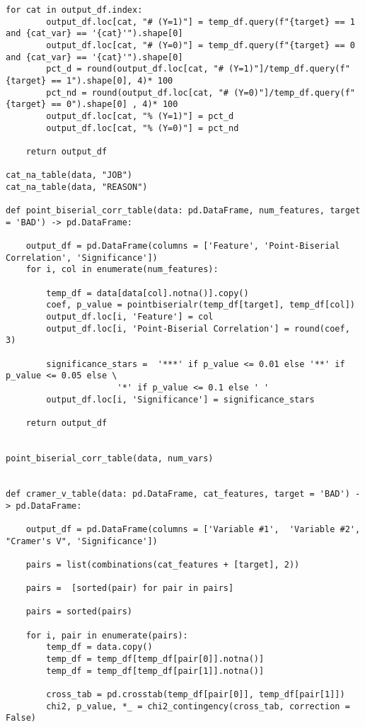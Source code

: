 \begin{lstlisting}[basicstyle=\footnotesize\ttfamily]
    for cat in output_df.index:
        output_df.loc[cat, "# (Y=1)"] = temp_df.query(f"{target} == 1 and {cat_var} == '{cat}'").shape[0]
        output_df.loc[cat, "# (Y=0)"] = temp_df.query(f"{target} == 0 and {cat_var} == '{cat}'").shape[0]
        pct_d = round(output_df.loc[cat, "# (Y=1)"]/temp_df.query(f"{target} == 1").shape[0], 4)* 100
        pct_nd = round(output_df.loc[cat, "# (Y=0)"]/temp_df.query(f"{target} == 0").shape[0] , 4)* 100
        output_df.loc[cat, "% (Y=1)"] = pct_d
        output_df.loc[cat, "% (Y=0)"] = pct_nd

    return output_df

cat_na_table(data, "JOB")
cat_na_table(data, "REASON")

def point_biserial_corr_table(data: pd.DataFrame, num_features, target = 'BAD') -> pd.DataFrame:
    
    output_df = pd.DataFrame(columns = ['Feature', 'Point-Biserial Correlation', 'Significance'])
    for i, col in enumerate(num_features):
        
        temp_df = data[data[col].notna()].copy()
        coef, p_value = pointbiserialr(temp_df[target], temp_df[col])
        output_df.loc[i, 'Feature'] = col
        output_df.loc[i, 'Point-Biserial Correlation'] = round(coef, 3)

        significance_stars =  '***' if p_value <= 0.01 else '**' if p_value <= 0.05 else \
		              '*' if p_value <= 0.1 else ' '
        output_df.loc[i, 'Significance'] = significance_stars

    return output_df
    

point_biserial_corr_table(data, num_vars)


def cramer_v_table(data: pd.DataFrame, cat_features, target = 'BAD') -> pd.DataFrame:
    
    output_df = pd.DataFrame(columns = ['Variable #1',  'Variable #2', "Cramer's V", 'Significance'])

    pairs = list(combinations(cat_features + [target], 2))

    pairs =  [sorted(pair) for pair in pairs]

    pairs = sorted(pairs)

    for i, pair in enumerate(pairs):
        temp_df = data.copy()
        temp_df = temp_df[temp_df[pair[0]].notna()]
        temp_df = temp_df[temp_df[pair[1]].notna()]

        cross_tab = pd.crosstab(temp_df[pair[0]], temp_df[pair[1]])
        chi2, p_value, *_ = chi2_contingency(cross_tab, correction = False)


\end{lstlisting}
